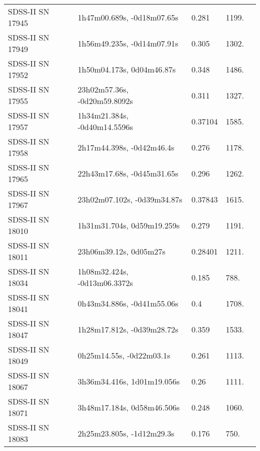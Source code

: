 \begin{longtable}{lllll}
 SDSS-II SN 17945 &     1h47m00.689s, -0d18m07.65s &    0.281 &          1199. &    \citet{2011ApJ...738..162S} \\
 SDSS-II SN 17949 &     1h56m49.235s, -0d14m07.91s &    0.305 &          1302. &    \citet{2010ApJ...713.1026D} \\
 SDSS-II SN 17952 &      1h50m04.173s, 0d04m46.87s &    0.348 &          1486. &    \citet{2011ApJ...738..162S} \\
 SDSS-II SN 17955 &   23h02m57.36s, -0d20m59.8092s &    0.311 &          1327. &    \citet{2011ApJ...738..162S} \\
 SDSS-II SN 17957 &   1h34m21.384s, -0d40m14.5596s &  0.37104 &          1585. &    \citet{2016SDSSD.C...0000:} \\
 SDSS-II SN 17958 &      2h17m44.398s, -0d42m46.4s &    0.276 &          1178. &    \citet{2011ApJ...738..162S} \\
 SDSS-II SN 17965 &     22h43m17.68s, -0d45m31.65s &    0.296 &          1262. &    \citet{2010ApJ...713.1026D} \\
 SDSS-II SN 17967 &    23h02m07.102s, -0d39m34.87s &  0.37843 &          1615. &    \citet{2016SDSSD.C...0000:} \\
 SDSS-II SN 18010 &     1h31m31.704s, 0d59m19.259s &    0.279 &          1191. &    \citet{2011ApJ...738..162S} \\
 SDSS-II SN 18011 &         23h06m39.12s, 0d05m27s &  0.28401 &          1211. &    \citet{2016SDSSD.C...0000:} \\
 SDSS-II SN 18034 &   1h08m32.424s, -0d13m06.3372s &    0.185 &           788. &    \citet{2011ApJ...738..162S} \\
 SDSS-II SN 18041 &     0h43m34.886s, -0d41m55.06s &      0.4 &          1708. &    \citet{2010ApJ...713.1026D} \\
 SDSS-II SN 18047 &     1h28m17.812s, -0d39m28.72s &    0.359 &          1533. &    \citet{2011ApJ...738..162S} \\
 SDSS-II SN 18049 &       0h25m14.55s, -0d22m03.1s &    0.261 &          1113. &    \citet{2010ApJ...713.1026D} \\
 SDSS-II SN 18067 &     3h36m34.416s, 1d01m19.056s &     0.26 &          1111. &    \citet{2011ApJ...738..162S} \\
 SDSS-II SN 18071 &     3h48m17.184s, 0d58m46.506s &    0.248 &          1060. &    \citet{2011ApJ...738..162S} \\
 SDSS-II SN 18083 &      2h25m23.805s, -1d12m29.3s &    0.176 &           750. &    \citet{2011ApJ...738..162S} \\

\end{longtable}
